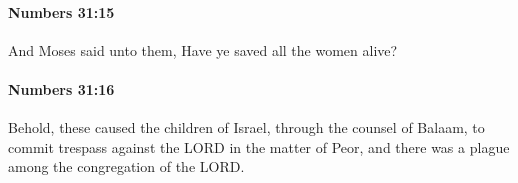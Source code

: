 		\paragraph{Numbers 31:15} %
			\label{NUMBERS-31-15}

			And Moses said unto them, Have ye saved all the women alive?


		\paragraph{Numbers 31:16} %
			\label{NUMBERS-31-16}

			Behold, these caused the children of Israel, through the counsel of Balaam, to commit trespass against the LORD in the matter of Peor, and there was a plague among the congregation of the LORD.


